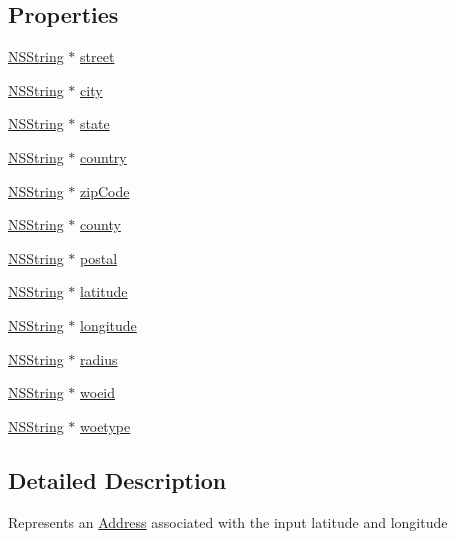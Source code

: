 \subsection*{\-Properties}
\begin{DoxyCompactItemize}
\item 
\hyperlink{class_n_s_string}{\-N\-S\-String} $\ast$ \hyperlink{interface_address_a0fb4f17e337bdf04c99dcd9a0b27f372}{street}
\item 
\hyperlink{class_n_s_string}{\-N\-S\-String} $\ast$ \hyperlink{interface_address_a6e06dcd3342c9c912ef49d27d61da630}{city}
\item 
\hyperlink{class_n_s_string}{\-N\-S\-String} $\ast$ \hyperlink{interface_address_ac36ffc6fe180c8246f3e1355b27809b6}{state}
\item 
\hyperlink{class_n_s_string}{\-N\-S\-String} $\ast$ \hyperlink{interface_address_aadc11beda97044e41fd1a8ecfd6a63fa}{country}
\item 
\hyperlink{class_n_s_string}{\-N\-S\-String} $\ast$ \hyperlink{interface_address_a1170e5f1fafb1f2a4b3d0ec23e0dca16}{zip\-Code}
\item 
\hyperlink{class_n_s_string}{\-N\-S\-String} $\ast$ \hyperlink{interface_address_ac6d30cd1baf5eb666edd109ed92edeb1}{county}
\item 
\hyperlink{class_n_s_string}{\-N\-S\-String} $\ast$ \hyperlink{interface_address_acad5d6da91bfaeda4b95e1edf9bc7f73}{postal}
\item 
\hyperlink{class_n_s_string}{\-N\-S\-String} $\ast$ \hyperlink{interface_address_a7f80372a7883d7d19ac35cc2abd6a18d}{latitude}
\item 
\hyperlink{class_n_s_string}{\-N\-S\-String} $\ast$ \hyperlink{interface_address_a5fd750f2db8fb258737b628b6a7e054d}{longitude}
\item 
\hyperlink{class_n_s_string}{\-N\-S\-String} $\ast$ \hyperlink{interface_address_a4a6f51a639603e4d8a81db7d20f15102}{radius}
\item 
\hyperlink{class_n_s_string}{\-N\-S\-String} $\ast$ \hyperlink{interface_address_a0d5eea8ea063877691868ba2912ea792}{woeid}
\item 
\hyperlink{class_n_s_string}{\-N\-S\-String} $\ast$ \hyperlink{interface_address_a6a0eb464fe79e147e913afa187992780}{woetype}
\end{DoxyCompactItemize}


\subsection{\-Detailed \-Description}
\-Represents an \hyperlink{interface_address}{\-Address} associated with the input latitude and longitude

